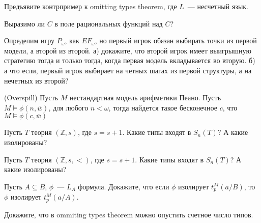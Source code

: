 \setcounter{curtask}{28}


\begin{task}
    Предъявите контрпример к omitting types theorem, где $L$~--- несчетный язык.
\end{task}

\breakline


\begin{ptask}{12}
    Выразимо ли $C$ в поле рациональных функций над $C$?
\end{ptask}

\begin{ptask}{17}
    Определим игру $P_{\omega}$, как $EF_{\omega}$, но первый игрок обязан выбирать
    точки из первой модели, а второй из второй.
	а) докажите, что второй игрок имеет выигрышную стратегию тогда и только тогда,
    когда первая модель вкладывается во вторую.
    б) а что если, первый игрок выбирает на четных шагах из первой структуры, а на
    нечетных из второй?
\end{ptask}

\begin{ptask}{19}(Overspill)
    Пусть $M$ нестандартная модель арифметики Пеано. Пусть
    $M \models \phi(n, \overline{w})$, для любого $n < \omega$, тогда найдется такое
    бесконечное $c$, что $M \models \phi(c, \overline{w})$
\end{ptask}

\begin{ptask}{24}
    Пусть $T$ теория $(\mathbb{Z}, s)$, где $s = s + 1$. Какие типы входят в
    $S_n(T)$? А какие изолированы?
\end{ptask}

\begin{ptask}{25}
    Пусть $T$ теория $(\mathbb{Z}, s, <)$, где $s = s + 1$. Какие типы входят в
    $S_n(T)$? А какие изолированы?
\end{ptask}

\begin{ptask}{26}
    Пусть $A \subseteq B$, $\phi$~--- $L_A$ формула. Докажите, что если $\phi$
    изолирует $t_p^M(a/B)$, то $\phi$ изолирует $t_p^M(a/A)$.
\end{ptask}

\begin{ptask}{27}
    Докажите, что в ommiting types theorem можно опустить счетное число типов.
\end{ptask}
